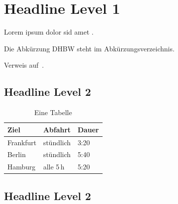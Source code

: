 \section{Headline Level 1}
\lipsum[1-2]

Lorem ipsum dolor sid amet \autocite[44]{mcconnell2004}.

Die Abkürzung DHBW steht im Abkürzungsverzeichnis.

Verweis auf~.

\subsection{Headline Level 2}
\lipsum[1]

\begin{table}[htbp]
    \caption{Eine Tabelle}
    \label{tab:tabelle}
    \centering
    \begin{tabular}{lll}
        \toprule
        Ziel      & Abfahrt   & Dauer \\
        \midrule
        Frankfurt & stündlich & 3:20  \\
        Berlin    & stündlich & 5:40  \\
        Hamburg   & alle 5\,h & 5:20  \\
        \bottomrule
    \end{tabular}
\end{table}

\subsection{Headline Level 2}
\lipsum[1]

